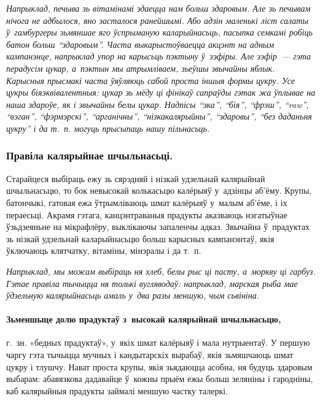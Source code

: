\emph{Напрыклад, печыва зь вітамінамі здаецца нам больш здаровым. Але зь печывам нічога не адбылося, яно засталося ранейшымі. Або адзін маленькі ліст салаты ў~гамбургеры зьмяншае яго ўспрыманую каларыйнасьць, пасыпка семкамі робіць батон больш ``здаровым''. Часта выкарыстоўваецца акцэнт на адным кампанэнце, напрыклад упор на карысьць пэктыну ў~зэфіры. Але зэфір~--- гэта перадусім цукар, а~пэктын мы атрымліваем, зьеўшы звычайны яблык. Карысныя прысмакі часта ўяўляюць сабой проста іншыя формы цукру. Усе цукры біяэквівалентныя: цукар зь мёду ці фінікаў сапраўды гэтак жа ўплывае на наша здароўе, як і звычайны белы цукар. Надпісы ``эка'', ``бія'', ``фрэш'', ``raw'', ``вэган'', ``фэрмэрскі'', ``арганічны'', ``нізкакалярыйны'', ``здаровы'', ``без даданьня цукру'' і да т.~п. могуць прысыпаць нашу пільнасьць.}

\subsubsection{Правіла калярыйнае шчыльнасьці.}
Старайцеся выбіраць ежу зь сярэдняй і нізкай удзельнай калярыйнай шчыльнасьцю, то бок невысокай колькасьцю калёрыяў у~адзінцы аб'ёму. Крупы, батончыкі, гатовая ежа ўтрымліваюць шмат калёрыяў у~малым аб'ёме, і іх пераесьці. Акрамя гэтага, канцэнтраваныя прадукты аказваюць нэгатыўнае ўзьдзеяньне на мікрафлёру, выклікаючы запаленчы адказ. Звычайна ў~прадуктах зь нізкай удзельнай каларыйнасьцю больш карысных кампанэнтаў, якія ўключаюць клятчатку, вітаміны, мінэралы і да т.~п.

\emph{Напрыклад, мы можам выбіраць ня хлеб, белы рыс ці пасту, а~моркву ці гарбуз. Гэтае правіла тычыцца ня толькі вугляводаў: напрыклад, марская рыба мае ўдзельную калярыйнасьць амаль у~два разы меншую, чым сьвініна.}

\paragraph{Зьменшыце долю прадуктаў з~высокай калярыйнай шчыльнасьцю,} г.~зн. «бедных прадуктаў», у~якіх шмат калёрыяў і мала нутрыентаў. У першую чаргу гэта тычыцца мучных і кандытарскіх вырабаў, якія зьмяшчаюць шмат цукру і тлушчу. Нават проста крупы, якія зьядаюцца асобна, ня будуць здаровым выбарам: абавязкова дадавайце ў~кожны прыём ежы больш зеляніны і гародніны, каб калярыйныя прадукты займалі меншую частку талеркі.

